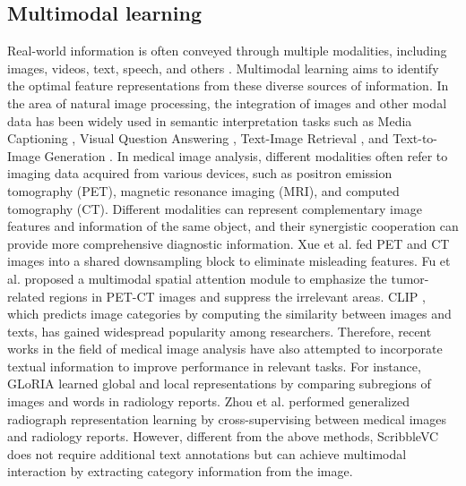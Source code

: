 \documentclass[sigconf,natbib=false]{acmart}
\begin{document}
\subsection{Multimodal learning}
Real-world information is often conveyed through multiple modalities, including images, videos, text, speech, and others \cite{Yang2023NeRCo}\cite{li2023chatdoctor}. Multimodal learning aims to identify the optimal feature representations from these diverse sources of information. In the area of natural image processing, the integration of images and other modal data has been widely used in semantic interpretation tasks such as Media Captioning 
\cite{wang2018video}\cite{lu2018neural}, Visual Question Answering 
\cite{hu2020iterative}\cite{marino2019ok}, Text-Image Retrieval \cite{wang2016learning} , and Text-to-Image Generation \cite{rombach2022high}\cite{rombach2022high}. In medical image analysis, different modalities often refer to imaging data acquired from various devices, such as positron emission tomography (PET), magnetic resonance imaging (MRI), and computed tomography (CT). Different modalities can represent complementary image features and information of the same object, and their synergistic cooperation can provide more comprehensive diagnostic information. Xue et al. \cite{xue2021multi} fed PET and CT images into a shared downsampling block to eliminate misleading features. Fu et al. \cite{fu2021multimodal} proposed a multimodal spatial attention module to emphasize the tumor-related regions in PET-CT images and suppress the irrelevant areas.
CLIP \cite{radford2021learning}, which predicts image categories by computing the similarity between images and texts, has gained widespread popularity among researchers. Therefore, recent works \cite{huang2021gloria}\cite{li2023lvit} in the field of medical image analysis have also attempted to incorporate textual information to improve performance in relevant tasks. For instance, GLoRIA \cite{huang2021gloria} learned global and local representations by comparing subregions of images and words in radiology reports. Zhou et al. \cite{zhou2022generalized} performed generalized radiograph representation learning by cross-supervising between medical images and radiology reports. However, different from the above methods, ScribbleVC does not require additional text annotations but can achieve multimodal interaction by extracting category information from the image.
\vspace{-4mm}
\end{document}
